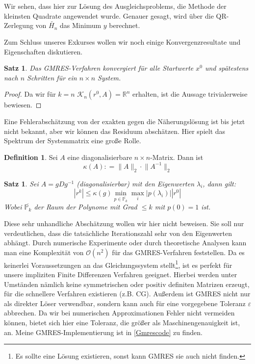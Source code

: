 \documentclass[12pt,a4paper]{scrartcl}
\numberwithin{equation}{section} %
\theoremstyle{definition}
\newtheorem{defn}[auf]{Definition}
\theoremstyle{plain}
\newtheorem{sa}[auf]{Satz}
\newcommand{\abs}[1]{\left\vert #1\right\vert}
\newcommand{\rr}{\mathbb{R}}
\begin{document}
Wir sehen, dass hier zur Lösung des Ausgleichsproblems, die Methode der kleinsten Quadrate angewendet wurde. Genauer gesagt, wird über die QR-Zerlegung von $\tilde{H_n}$ das Minimum $y$ berechnet.
\par Zum Schluss unseres Exkurses wollen wir noch einige Konvergenzresultate und Eigenschaften diskutieren.
\begin{sa}
Das GMRES-Verfahren konvergiert für alle Startwerte $x^0$ und spätestens nach $n$ Schritten für ein $n\times n$ System.
\end{sa}
\begin{proof}
Da wir für $k=n$ $\mathcal{K}_n(r^0,A)=\rr^n$ erhalten,  ist die Aussage trivialerweise bewiesen.
\end{proof}
Eine Fehlerabschätzung von der exakten gegen die Näherungslösung ist bis jetzt nicht bekannt, aber wir können das Residuum abschätzen. Hier spielt das Spektrum der Systemmatrix eine große Rolle.
\begin{defn}
Sei $A$ eine diagonalisierbare $n\times n$-Matrix. Dann ist
\begin{equation}
\kappa(A)\colon =\big\lVert A\big\rVert_2\cdot\big\lVert A^{-1}\big\rVert_2
\end{equation} 
\end{defn}
\begin{sa}
Sei $A=gDg^{-1}$ (diagonalisierbar) mit den Eigenwerten $\lambda_i$, dann gilt:
\begin{equation}
\abs{r^k}\le\kappa(g)\min_{p\in\overline{\mathbb{P}_k}}\max_i\abs{p(\lambda_i)}\abs{r^0}
\end{equation}
Wobei $\overline{\mathbb{P}_k}$ der Raum der Polynome mit Grad $\le k$ mit $p(0)=1$ ist. 
\end{sa}
Diese sehr unhandliche Abschätzung wollen wir hier nicht beweisen. Sie soll nur verdeutlichen, dass die tatsächliche Iterationszahl sehr von den Eigenwerten abhängt. Durch numerische Experimente oder durch theoretische Analysen kann man eine Komplexität von $\mathcal{O}(n^2)$ für das GMRES-Verfahren feststellen. Da es keinerlei Voraussetzungen an das Gleichungssystem stellt\footnote{Es sollte eine Lösung existieren, sonst kann GMRES sie auch nicht finden.}, ist es perfekt für unsere impliziten Finite Differenzen Verfahren geeignet. Hierbei werden unter Umständen nämlich keine symmetrischen oder positiv definiten Matrizen erzeugt, für die schnellere Verfahren existieren (z.B. CG). Außerdem ist GMRES nicht nur als direkter Löser verwendbar, sondern kann auch für eine vorgegebene Toleranz $\varepsilon$ abbrechen. Da wir bei numerischen Approximationen Fehler nicht vermeiden können, bietet sich hier eine Toleranz, die größer als Maschinengenauigkeit ist, an. Meine GMRES-Implementierung ist in \ref{Gmrescode} zu finden.
\end{document}
